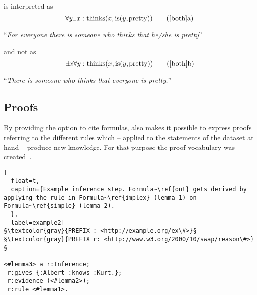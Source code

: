  is interpreted as 
\begin{equation} %
\forall y \exists x : \text{thinks}(x,\text{is}(y,\text{pretty})) \tag{\ref{both}a}
\end{equation}
\begin{center}``\textit{For everyone there is someone who thinks that he/she is pretty}''\end{center}
and not as
\begin{equation} %
\exists x \forall  y : \text{thinks}(x,\text{is}(y,\text{pretty})) \tag{\ref{both}b}
\end{equation}
\begin{center}``\textit{There is someone who thinks that everyone is pretty.}'' \end{center}

% 
\subsection{Proofs}\label{proofintro}

By providing the option to cite formulas, \nthree also makes it possible to express proofs referring to the different rules which -- applied to the statements
of the dataset at hand 
--
produce new knowledge. %
For that purpose the \nthree
proof vocabulary was created~\cite{Proof}. %

\begin{lstlisting}[
  float=t,
  caption={Example inference step. Formula~\ref{out} gets derived by applying the rule in Formula~\ref{implex} (lemma 1) on Formula~\ref{simple} (lemma 2). 
  },
  label=example2]
§\textcolor{gray}{PREFIX : <http://example.org/ex\#>}§
§\textcolor{gray}{PREFIX r: <http://www.w3.org/2000/10/swap/reason\#>}§

<#lemma3> a r:Inference; 
 r:gives {:Albert :knows :Kurt.}; 
 r:evidence (<#lemma2>);
 r:rule <#lemma1>.
\end{lstlisting}

